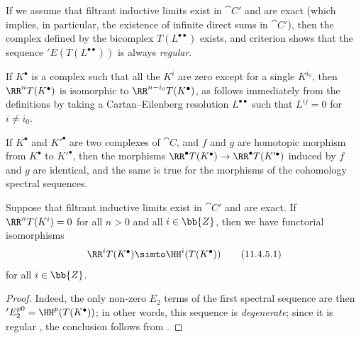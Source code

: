 \begin{env}[11.4.3]
If we assume that filtrant inductive limits exist in $\cat{C}'$ and are exact (which implies, in particular, the existence of infinite direct sums in $\cat{C}'$), then the complex defined by the bicomplex $T(L^{\bullet\bullet})$ exists, and criterion  shows that the sequence $'E(T(L^{\bullet\bullet}))$ is always \emph{regular}.

If $K^\bullet$ is a complex such that all the $K^i$ are zero except for a single $K^{i_0}$, then
$\RR^n T(K^\bullet)$ is isomorphic to $\RR^{n-i_0} T(K^\bullet)$, as follows immediately from the definitions by taking a Cartan--Eilenberg resolution $L^{\bullet\bullet}$ such that $L^{ij}=0$ for $i\neq i_0$.

If $K^\bullet$ and $K'^\bullet$ are two complexes of $\cat{C}$, and $f$ and $g$ are homotopic morphism from $K^\bullet$ to $K'^\bullet$, then the morphisms $\RR^\bullet T(K^\bullet) \rightarrow \RR^\bullet T(K'^\bullet)$ induced by $f$ and $g$ are identical, and the same is true for the morphisms of the cohomology spectral sequences.
\end{env}

\begin{proposition}[11.4.5]
\label{0.11.4.5}
Suppose that filtrant inductive limits exist in $\cat{C}'$ and are exact.
If $\RR^n T(K^i) = 0$ for all $n>0$ and all $i\in\bb{Z}$, then we have functorial isomorphisms
\[
\label{0.11.4.5.1}
  \RR^i T(K^\bullet) \simto \HH^i(T(K^\bullet))
\tag{11.4.5.1}
\]
for all $i\in\bb{Z}$.
\end{proposition}

\begin{proof}
Indeed, the only non-zero $E_2$ terms of the first spectral sequence  are then $'E_2^{p0} = \HH^p(T(K^\bullet))$;
in other words, this sequence is \emph{degenerate};
since it is regular , the conclusion follows from .
\end{proof}

